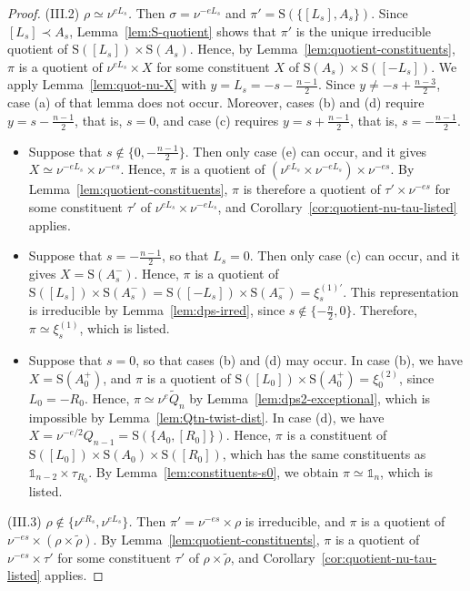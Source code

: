 \documentclass[11pt]{amsart}
\numberwithin{equation}{section}
\theoremstyle{plain}
\theoremstyle{definition}
\theoremstyle{remark}
\newcommand{\one}{\mathds{1}}
\newcommand{\Qt}{\widetilde{Q}}
\newcommand{\xione}{\xi^{(1)}}
\newcommand{\xitwo}{\xi^{(2)}}
\newcommand{\Ss}{\mathrm{S}}
\begin{document}
\begin{proof}
	(III.2) \emph{$\rho\simeq\nu^{eL_s}$.} Then $\sigma=\nu^{-eL_s}$ and $\pi'=\Ss(\{[L_s],A_s\})$. Since $[L_s]\prec A_s$, Lemma~\ref{lem:S-quotient} shows that $\pi'$ is the unique irreducible quotient of $\Ss([L_s])\times\Ss(A_s)$. Hence, by Lemma~\ref{lem:quotient-constituents}, $\pi$ is a quotient of $\nu^{eL_s}\times X$ for some constituent $X$ of $\Ss(A_s)\times\Ss([-L_s])$. We apply Lemma~\ref{lem:quot-nu-X} with $y=L_s=-s-\frac{n-1}2$. Since $y\ne-s+\frac{n-3}2$, case (a) of that lemma does not occur. Moreover, cases (b) and (d) require $y=s-\frac{n-1}2$, that is, $s=0$, and case (c) requires $y=s+\frac{n-1}2$, that is, $s=-\frac{n-1}2$.
	\begin{itemize}
		\item Suppose that $s\notin\{0,-\frac{n-1}2\}$. Then only case (e) can occur, and it gives $X\simeq\nu^{-eL_s}\times\nu^{-es}$. Hence, $\pi$ is a quotient of $(\nu^{eL_s}\times\nu^{-eL_s})\times\nu^{-es}$. By Lemma~\ref{lem:quotient-constituents}, $\pi$ is therefore a quotient of $\tau'\times\nu^{-es}$ for some constituent $\tau'$ of $\nu^{eL_s}\times\nu^{-eL_s}$, and Corollary~\ref{cor:quotient-nu-tau-listed} applies.
		\item Suppose that $s=-\frac{n-1}2$, so that $L_s=0$. Then only case (c) can occur, and it gives $X=\Ss(A_s^-)$. Hence, $\pi$ is a quotient of $\Ss([L_s])\times\Ss(A_s^-)=\Ss([-L_s])\times\Ss(A_s^-)=\xi^{(1)\prime}_s$. This representation is irreducible by Lemma~\ref{lem:dps-irred}, since $s\notin\{-\frac n2,0\}$. Therefore, $\pi\simeq\xione_s$, which is listed.
		\item Suppose that $s=0$, so that cases (b) and (d) may occur. In case (b), we have $X=\Ss(A_0^+)$, and $\pi$ is a quotient of $\Ss([L_0])\times\Ss(A_0^+)=\xitwo_0$, since $L_0=-R_0$. Hence, $\pi\simeq\nu^e\Qt_n$ by Lemma~\ref{lem:dps2-exceptional}, which is impossible by Lemma~\ref{lem:Qtn-twist-dist}. In case (d), we have $X=\nu^{-e/2}Q_{n-1}=\Ss(\{A_0,[R_0]\})$. Hence, $\pi$ is a constituent of $\Ss([L_0])\times\Ss(A_0)\times\Ss([R_0])$, which has the same constituents as $\one_{n-2}\times\tau_{R_0}$. By Lemma~\ref{lem:constituents-s0}, we obtain $\pi\simeq\one_n$, which is listed.
	\end{itemize}
	
	(III.3) \emph{$\rho\notin\{\nu^{eR_s},\nu^{eL_s}\}$.} Then $\pi'=\nu^{-es}\times\rho$ is irreducible, and $\pi$ is a quotient of $\nu^{-es}\times(\rho\times\widetilde\rho)$. By Lemma~\ref{lem:quotient-constituents}, $\pi$ is a quotient of $\nu^{-es}\times\tau'$ for some constituent $\tau'$ of $\rho\times\widetilde\rho$, and Corollary~\ref{cor:quotient-nu-tau-listed} applies.
	

\end{proof}
\end{document}
